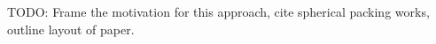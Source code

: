TODO: Frame the motivation for this approach, cite spherical packing works, outline layout of paper.